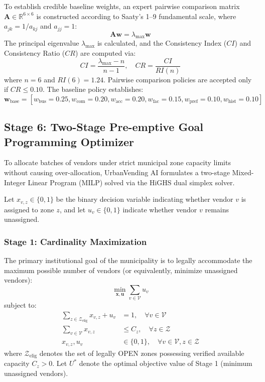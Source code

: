 To establish credible baseline weights, an expert pairwise comparison matrix $\mathbf{A} \in \mathbb{R}^{6 \times 6}$ is constructed according to Saaty's 1–9 fundamental scale, where $a_{jk} = 1 / a_{kj}$ and $a_{jj} = 1$:
\begin{equation}
    \mathbf{A} \mathbf{w} = \lambda_{\max} \mathbf{w}
    \label{eq:ahp_eigen}
\end{equation}
The principal eigenvalue $\lambda_{\max}$ is calculated, and the Consistency Index ($CI$) and Consistency Ratio ($CR$) are computed via:
\begin{equation}
    CI = \frac{\lambda_{\max} - n}{n - 1}, \quad CR = \frac{CI}{RI(n)}
    \label{eq:cr}
\end{equation}
where $n = 6$ and $RI(6) = 1.24$. Pairwise comparison policies are accepted only if $CR \le 0.10$. The baseline policy establishes:
\begin{equation}
    \mathbf{w}_{\text{base}} = [w_{\text{bus}}=0.25, w_{\text{com}}=0.20, w_{\text{acc}}=0.20, w_{\text{fac}}=0.15, w_{\text{pref}}=0.10, w_{\text{hist}}=0.10]
    \label{eq:base_weights}
\end{equation}

\subsection{Stage 6: Two-Stage Pre-emptive Goal Programming Optimizer}
\label{sec:meth_stage6}

To allocate batches of vendors under strict municipal zone capacity limits without causing over-allocation, UrbanVending AI formulates a two-stage Mixed-Integer Linear Program (MILP) solved via the HiGHS dual simplex solver.

Let $x_{v,z} \in \{0, 1\}$ be the binary decision variable indicating whether vendor $v$ is assigned to zone $z$, and let $u_v \in \{0, 1\}$ indicate whether vendor $v$ remains unassigned.

\subsubsection{Stage 1: Cardinality Maximization}
The primary institutional goal of the municipality is to legally accommodate the maximum possible number of vendors (or equivalently, minimize unassigned vendors):
\begin{equation}
    \min_{\mathbf{x}, \mathbf{u}} \sum_{v \in \mathcal{V}} u_v
    \label{eq:milp_stage1}
\end{equation}
subject to:
\begin{align}
    \sum_{z \in \mathcal{Z}_{\text{elig}}} x_{v,z} + u_v &= 1, \quad \forall v \in \mathcal{V} \label{eq:con_vendor} \\
    \sum_{v \in \mathcal{V}} x_{v,z} &\le C_z, \quad \forall z \in \mathcal{Z} \label{eq:con_capacity} \\
    x_{v,z}, u_v &\in \{0, 1\}, \quad \forall v \in \mathcal{V}, z \in \mathcal{Z} \label{eq:con_binary}
\end{align}
where $\mathcal{Z}_{\text{elig}}$ denotes the set of legally OPEN zones possessing verified available capacity $C_z > 0$. Let $U^*$ denote the optimal objective value of Stage 1 (minimum unassigned vendors).


